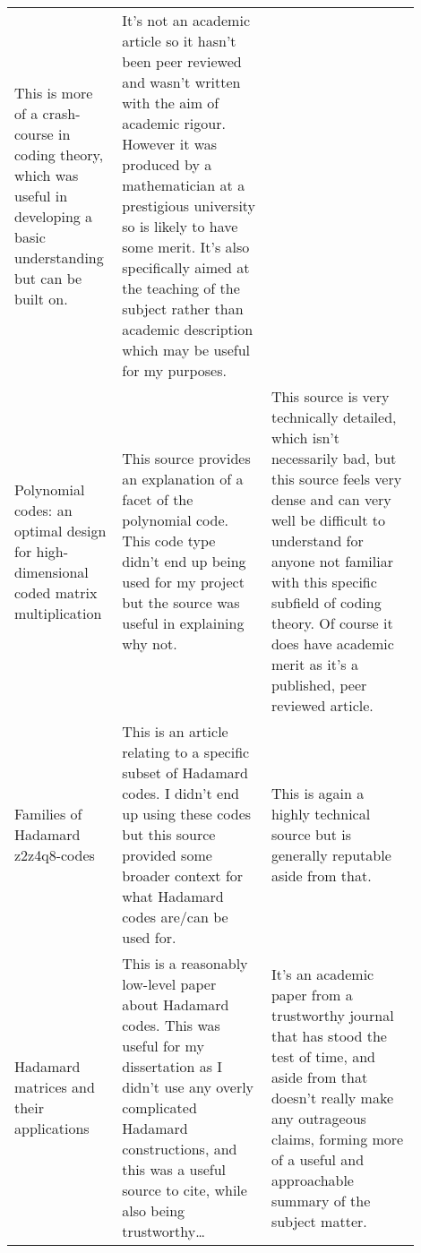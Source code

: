 \documentclass{article}
\begin{document}
\begin{center}
{\begin{longtable}{p{0.2\linewidth} p{0.35\linewidth} p{0.35\linewidth}}
    This is more of a crash-course in coding theory, which was useful in
    developing a basic understanding but can be built on. &

    It's not an academic article so it hasn't been peer reviewed and wasn't
    written with the aim of academic rigour. However it was produced by a
    mathematician at a prestigious university so is likely to have some merit.
    It's also specifically aimed at the teaching of the subject rather than
    academic description which may be useful for my purposes. \\

    Polynomial codes: an optimal design for high-dimensional coded matrix multiplication \citep*{PolynomialCodes2017MaddahAvestimehr} &

    This source provides an explanation of a facet of the polynomial code. This
    code type didn't end up being used for my project but the source was useful
    in explaining why not. &

    This source is very technically detailed, which isn't necessarily bad, but
    this source feels very dense and can very well be difficult to understand
    for anyone not familiar with this specific subfield of coding theory.  Of
    course it does have academic merit as it's a published, peer reviewed
    article. \\

    Families of Hadamard z2z4q8-codes \citep*{HadamardZ2Z2012RioRifa} & 

    This is an article relating to a specific subset of Hadamard codes. I
    didn't end up using these codes but this source provided some broader
    context for what Hadamard codes are/can be used for. &

    This is again a highly technical source but is generally reputable aside
    from that. \\

    Hadamard matrices and their applications \citep*{HadamardMatrices1978HedayatWallis} &

    This is a reasonably low-level paper about Hadamard codes. This was useful
    for my dissertation as I didn't use any overly complicated Hadamard
    constructions, and this was a useful source to cite, while also being
    trustworthy\ldots &

    It's an academic paper from a trustworthy journal that has stood the test
    of time, and aside from that doesn't really make any outrageous claims,
    forming more of a useful and approachable summary of the subject matter. \\


\end{longtable}}
\end{center}
\end{document}
